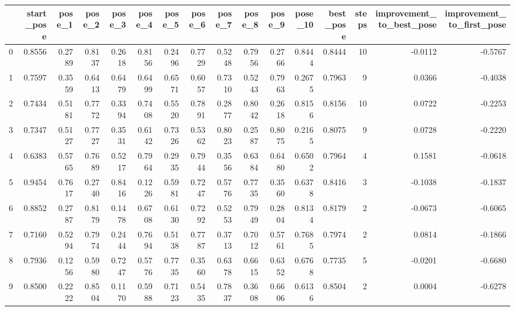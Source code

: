 \begin{tabular}{lrrrrrrrrrrrrrrr}
\toprule
{} &  start\_pose &  pose\_1 &  pose\_2 &  pose\_3 &  pose\_4 &  pose\_5 &  pose\_6 &  pose\_7 &  pose\_8 &  pose\_9 &  pose\_10 &  best\_pose &  steps &  improvement\_to\_best\_pose &  improvement\_to\_first\_pose \\
\midrule
0  &      0.8556 &  0.2789 &  0.8137 &  0.2618 &  0.8156 &  0.2496 &  0.7729 &  0.5248 &  0.7956 &  0.2766 &   0.8444 &     0.8444 &     10 &                   -0.0112 &                    -0.5767 \\
1  &      0.7597 &  0.3559 &  0.6413 &  0.6479 &  0.6499 &  0.6571 &  0.6057 &  0.7310 &  0.5243 &  0.7963 &   0.2675 &     0.7963 &      9 &                    0.0366 &                    -0.4038 \\
2  &      0.7434 &  0.5181 &  0.7772 &  0.3394 &  0.7408 &  0.5520 &  0.7891 &  0.2877 &  0.8042 &  0.2618 &   0.8156 &     0.8156 &     10 &                    0.0722 &                    -0.2253 \\
3  &      0.7347 &  0.5127 &  0.7727 &  0.3531 &  0.6142 &  0.7326 &  0.5362 &  0.8023 &  0.2587 &  0.8075 &   0.2165 &     0.8075 &      9 &                    0.0728 &                    -0.2220 \\
4  &      0.6383 &  0.5765 &  0.7689 &  0.5217 &  0.7964 &  0.2935 &  0.7944 &  0.3556 &  0.6384 &  0.6480 &   0.6502 &     0.7964 &      4 &                    0.1581 &                    -0.0618 \\
5  &      0.9454 &  0.7617 &  0.2740 &  0.8416 &  0.1226 &  0.5981 &  0.7247 &  0.5776 &  0.7735 &  0.3560 &   0.6378 &     0.8416 &      3 &                   -0.1038 &                    -0.1837 \\
6  &      0.8852 &  0.2787 &  0.8179 &  0.1478 &  0.6708 &  0.6130 &  0.7292 &  0.5253 &  0.7949 &  0.2804 &   0.8134 &     0.8179 &      2 &                   -0.0673 &                    -0.6065 \\
7  &      0.7160 &  0.5294 &  0.7974 &  0.2444 &  0.7694 &  0.5138 &  0.7787 &  0.3713 &  0.7012 &  0.5761 &   0.7685 &     0.7974 &      2 &                    0.0814 &                    -0.1866 \\
8  &      0.7936 &  0.1256 &  0.5980 &  0.7247 &  0.5776 &  0.7735 &  0.3560 &  0.6378 &  0.6615 &  0.6352 &   0.6768 &     0.7735 &      5 &                   -0.0201 &                    -0.6680 \\
9  &      0.8500 &  0.2222 &  0.8504 &  0.1170 &  0.5988 &  0.7123 &  0.5435 &  0.7837 &  0.3608 &  0.6606 &   0.6136 &     0.8504 &      2 &                    0.0004 &                    -0.6278 \\

\end{tabular}
